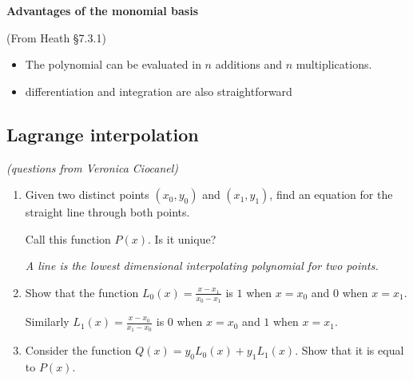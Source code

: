 \documentclass[12pt,letterpaper,noanswers]{exam}
\def\dsst{\displaystyle}
\begin{document}
\noindent\textbf{Advantages of the monomial basis}
\begin{tcolorbox}
(From Heath \S 7.3.1)
\begin{itemize}
\itemsep0pt
    \item 
    
    The polynomial can be evaluated in $n$ additions and $n$ multiplications.
    
    \item differentiation and integration are also straightforward
   
\end{itemize}

\end{tcolorbox}

\subsection*{Lagrange interpolation}
\emph{(questions from Veronica Ciocanel)}
\begin{enumerate}[resume=classQ]

\item Given two distinct points $(x_0,y_0)$ and $(x_1,y_1)$, find an equation for the
straight line through both points. 

Call this function $P(x)$.  Is it unique?

\emph{A line is the lowest dimensional interpolating polynomial for two points.}

\vspace{1in}

\item Show that the function $\dsst{L_0(x) = \frac{x-x_1}{x_0-x_1}}$ is $1$
when $x=x_0$ and $0$ when $x=x_1$.  

Similarly $\dsst{L_1(x) = \frac{x-x_0}{x_1-x_0}}$
is $0$ when $x=x_0$ and $1$ when $x=x_1$.

\vspace{1in}

\item Consider the function $Q(x) = y_0L_0(x) + y_1L_1(x)$.  Show that it is
equal to $P(x)$.

\vspace{1in}

\end{enumerate}
\end{document}
